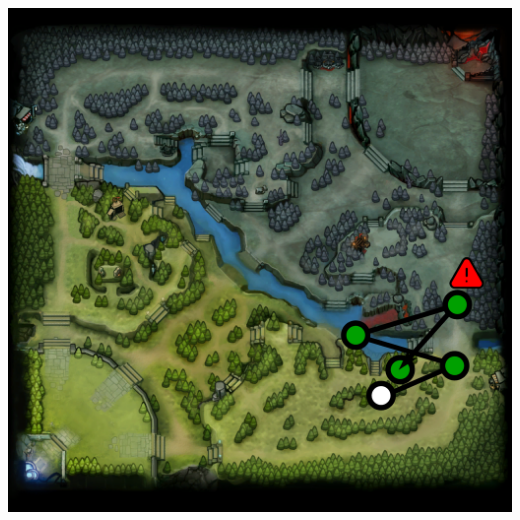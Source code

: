 \documentclass{article}
\newenvironment{remarks}
    {
        \begin{description}
            \setlength\itemsep{0em}
    }
    {
        \end{description}
    }
\begin{document}
\begin{remarks}
{\begin{center}
\begin{minipage}[t]{0.3\textwidth}
    \end{minipage}
\begin{minipage}[t]{0.3\textwidth}
    \includegraphics[width=\textwidth]{img/1950good.pdf}
    

\end{minipage}
\end{center}}
\end{remarks}
\end{document}
